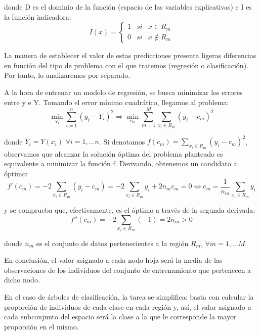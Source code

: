 \documentclass[12pt,twoside]{article}
\begin{document}
\noindent
donde D es el dominio de la función (espacio de las variables explicativas) e I es la función indicadora:
\begin{equation*}
I(x) = 
\left\{
\begin{array}{ccc}
1 & si & x \in R_m \\
0 & si & x \not\in R_m 
\end{array}
\right.
\end{equation*}

La manera de establecer el valor de estas predicciones presenta ligeras diferencias en función del tipo de problema con el que tratemos (regresión o clasificación). Por tanto, lo analizaremos por separado.


A la hora de entrenar un modelo de regresión, se busca minimizar los errores entre y e Y. Tomando el error mínimo cuadrático, llegamos al problema:
\begin{equation*}
\min_{Y_i} \sum_{i=1}^n (y_i - Y_i)^2 \Rightarrow \min_{c_m} \sum_{m = 1}^M \sum_{x_i \in R_m} (y_i - c_m)^2
\end{equation*}

\noindent
donde $Y_i = Y(x_i) \, \, \forall i=1,...n$. Si denotamos $f(c_m) = \sum_{x_i \in R_m} (y_i - c_m)^2$, observamos que alcanzar la solución óptima del problema planteado es equivalente a minimizar la función f. Derivando, obtenemos un candidato a óptimo:
\begin{equation*}
f'(c_m) = -2 \sum_{x_i \in R_m} (y_i - c_m) = -2 \sum_{x_i \in R_m}y_i + 2n_mc_m = 0 \Leftrightarrow c_m = \frac{1}{n_m} \sum_{x_i \in R_m}y_i
\end{equation*}

\noindent
y se comprueba que, efectivamente, es el óptimo a través de la segunda derivada:
\begin{equation*}
f''(c_m) = -2 \sum_{x_i \in R_m} (-1) = 2n_m > 0
\end{equation*}

\noindent
donde $n_m$ es el conjunto de datos pertenecientes a la región $R_m$, $\forall m = 1,...M$.

En conclusión, el valor asignado a cada nodo hoja será la media de las observaciones de los individuos del conjunto de entrenamiento que pertenecen a dicho nodo.

En el caso de árboles de clasificación, la tarea se simplifica: basta con calcular la proporción de individuos de cada clase en cada región y, así, el valor asignado a cada subconjunto del espacio será la clase a la que le corresponde la mayor proporción en el mismo.
\end{document}
